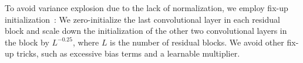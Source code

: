 
To avoid variance explosion due to the lack of normalization, we employ fix-up initialization~\cite{fixup}: 
We zero-initialize the last convolutional layer in each residual block and scale down the initialization of the other two convolutional layers in the block by $L^{-0.25}$, where $L$ is the number of residual blocks. We avoid other fix-up tricks, such as excessive bias terms and a learnable multiplier.

